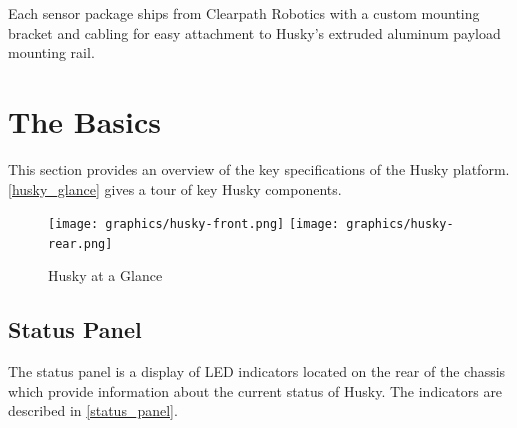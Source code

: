 \documentclass[]{clearpath-latex/clearpath-manual}
\begin{document}
Each sensor package ships from Clearpath Robotics with a custom mounting bracket and cabling for easy attachment to Husky’s extruded aluminum payload mounting rail.


\section{The Basics}

This section provides an overview of the key specifications of the Husky platform. \autoref{husky_glance} gives a tour of key Husky components.


\begin{figure}[h]
  \centering
  \texttt{[image: graphics/husky-front.png]}
  \texttt{[image: graphics/husky-rear.png]}
  \caption{Husky at a Glance}
  \label{husky_glance}
\end{figure}
\newpage

\subsection{Status Panel}

The status panel is a display of LED indicators located on the rear of the chassis which
provide information about the current status of Husky. The indicators are described in \autoref{status_panel}.
\end{document}
